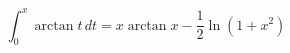 \begin{displaymath}
  \int_0^x \arctan t \, dt
  = x\arctan x - \frac{1}{2} \ln(1+x^2)
\end{displaymath}
